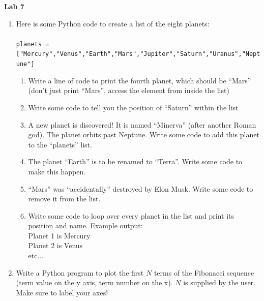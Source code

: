 \documentclass{article}
\begin{document}
\fancyfoot[C]{\thepage}
\vspace*{0cm}
\begin{center}
	{\LARGE \textbf{Lab 7}}\\
	\vspace{.25cm}
\end{center}

\begin{enumerate}
	\item Here is some Python code to create a list of the eight planets:\\ \\
	\texttt{planets = ["Mercury","Venus","Earth","Mars","Jupiter","Saturn","Uranus","Neptune"]}\\
	\begin{enumerate}
		\item Write a line of code to print the fourth planet, which should be ``Mars'' (don't just print ``Mars'', access the element from inside the list)
		\item Write some code to tell you the position of ``Saturn'' within the list
		\item A new planet is discovered! It is named ``Minerva'' (after another Roman god). The planet orbits past Neptune. Write some code to add this planet to the ``planets'' list.
		\item The planet ``Earth'' is to be renamed to ``Terra''. Write some code to make this happen.
		\item ``Mars'' was ``accidentally'' destroyed by Elon Musk. Write some code to remove it from the list.
		\item Write some code to loop over every planet in the list and print its position and name. Example output:\\
		Planet 1 is Mercury\\Planet 2 is Venus\\etc...
	\end{enumerate}
	\item Write a Python program to plot the first $N$ terms of the Fibonacci sequence (term value on the y axis, term number on the x). $N$ is supplied by the user. Make sure to label your axes!

\end{enumerate}
\end{document}

